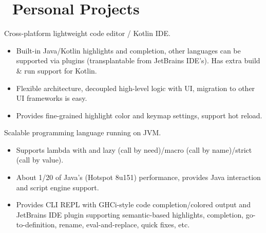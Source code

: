 \documentclass{resume}
\begin{document}
\section{\faGithubAlt\ Personal Projects}
Cross-platform lightweight code editor / Kotlin IDE.
\begin{itemize}
  \item Built-in Java/Kotlin highlights and completion, other languages can be supported
    via plugins (transplantable from JetBrains IDE's).
    Has extra build \& run support for Kotlin.
  \item Flexible architecture, decoupled high-level logic with UI, migration to other UI frameworks is easy.
  \item Provides fine-grained highlight color and keymap settings, support hot reload.
\end{itemize}

Scalable programming language running on JVM.
\begin{itemize}
  \item Supports lambda with and lazy (call by need)/macro (call by name)/strict (call by value).
  \item About 1/20 of Java's (Hotspot 8u151) performance, provides Java interaction and script engine support.
  \item Provides CLI REPL with GHCi-style code completion/colored output and JetBrains
    IDE plugin supporting semantic-based highlights, completion, go-to-definition, rename, eval-and-replace, quick fixes, etc.
\end{itemize}
\end{document}
